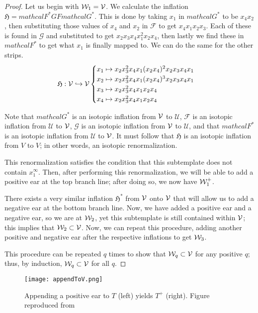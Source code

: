 \documentclass[paper.tex]{subfiles}
\begin{document}
\begin{proof}
Let us begin with $\mathcal{W}_1 = \mathcal{V}$. We calculate the inflation $\mathfrak{H} = mathcal{F}^* G F mathcal{G}^*$. This is done by taking $x_1$ in $mathcal{G}^*$ to be $x_4 x_2$, then substituting those values of $x_4$ and $x_2$ in $\mathcal{F}$ to get $x_4 x_1 x_2 x_3$. Each of these is found in $\mathcal{G}$ and substituted to get $x_2 x_3 x_4 x_1^2 x_2 x_4$, then lastly we find these in $mathcal{F}^*$ to get what $x_1$ is finally mapped to. We can do the same for the other strips.
    $$\mathfrak{H}: \mathcal{V} \hookrightarrow \mathcal{V} \begin{cases}
        x_1 \mapsto x_2 x_3^2 x_4 x_1 (x_2 x_4)^2 x_2 x_3 x_4 x_1 \\
        x_2 \mapsto x_2 x_3^2 x_4 x_1 (x_2 x_4)^3 x_2 x_3 x_4 x_1 \\
        x_3 \mapsto x_2 x_3^2 x_4 x_1  x_2 x_4  \\
        x_4 \mapsto x_2 x_3^2 x_4 x_1  x_2 x_4  \end{cases} $$

        Note that $mathcal{G}^*$ is an isotopic inflation from $\mathcal{V}$ to $\mathcal{U}$, $\mathcal{F}$ is an isotopic inflation from $\mathcal{U}$ to $\mathcal{V}$, $\mathcal{G}$ is an isotopic inflation from $\mathcal{V}$ to $\mathcal{U}$, and that $mathcal{F}^*$ is an isotopic inflation from $\mathcal{U}$ to $\mathcal{V}$. It must follow that $\mathfrak{H}$ is an isotopic inflation from $V$ to $V$; in other words, an isotopic renormalization.

        This renormalization satisfies the condition that this subtemplate does not contain $x_1^\infty$. Then, after performing this renormalization, we will be able to add a positive ear at the top branch line; after doing so, we now have $\mathcal{W}_1^+$.

        There exists a very similar inflation $\mathfrak{H}^*$ from $\mathcal{V}$ onto $\mathcal{V}$ that will allow us to add a negative ear at the bottom branch line. Now, we have added a positive ear and a negative ear, so we are at $\mathcal{W}_2$, yet this subtemplate is still contained within $\mathcal{V}$; this implies that $\mathcal{W}_2 \subset \mathcal{V}$. Now, we can repeat this procedure, adding another positive and negative ear after the respective inflations to get $\mathcal{W}_3$.

        This procedure can be repeated $q$ times to show that $\mathcal{W}_q \subset \mathcal{V}$ for any positive $q$; thus, by induction, $\mathcal{W}_q \subset \mathcal{V}$ for all $q$.
    \end{proof}


\begin{figure}[h]
    \centering
    \texttt{[image: appendToV.png]}
    \caption{Appending a positive ear to $T$ (left) yields $T^+$ (right). Figure reproduced from~\cite{Ghrist1996}} \label{fig:appendToV} %
\end{figure}
\end{document}
